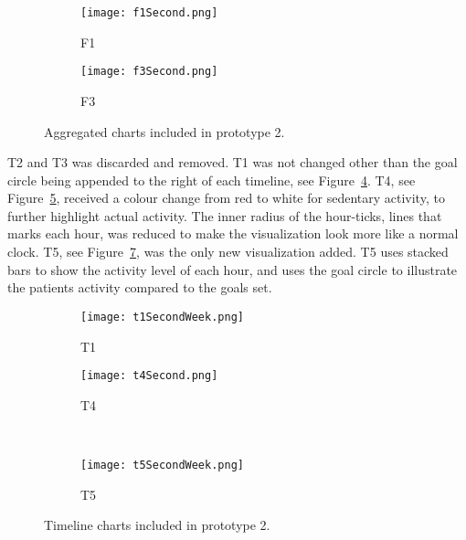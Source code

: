 \begin{figure}[h!]
  \centering
  \begin{subfigure}[b]{0.60\textwidth}
    \centering
    \texttt{[image: f1Second.png]}
    \caption{F1}
    \label{fig:f1Second}
  \end{subfigure}
  \begin{subfigure}[b]{0.39\textwidth}
    \centering
    \texttt{[image: f3Second.png]}
    \caption{F3}
    \label{fig:f3Second}
  \end{subfigure}
  \caption[Second version of F1 and F3]{Aggregated charts included in prototype 2.}
  \label{fig:aggCharts}
\end{figure}

T2 and T3 was discarded and removed. T1 was not changed other than the goal circle being appended to the right of each timeline, see Figure~\ref{fig:t1}. T4, see Figure~\ref{fig:t4}, received a colour change from red to white for sedentary activity, to further highlight actual activity. The inner radius of the hour-ticks, lines that marks each hour, was reduced to make the visualization look more like a normal clock. T5, see Figure~\ref{fig:t5}, was the only new visualization added. T5 uses stacked bars to show the activity level of each hour, and uses the goal circle to illustrate the patients activity compared to the goals set.

\begin{figure}[h!]
  \centering
  \begin{subfigure}[b]{0.6\textwidth}
    \centering
    \texttt{[image: t1SecondWeek.png]}
    \caption{T1}
    \label{fig:t1}
  \end{subfigure}
  \begin{subfigure}[b]{0.35\textwidth}
    \centering
    \texttt{[image: t4Second.png]}
    \caption{T4}
    \label{fig:t4}
  \end{subfigure}
  \\
  \begin{subfigure}[b]{0.95\textwidth}
    \centering
    \texttt{[image: t5SecondWeek.png]}
    \caption{T5}
    \label{fig:t5}
  \end{subfigure}
  \caption[Second version of T1, T4 and first version of T5]{Timeline charts included in prototype 2.}
\end{figure}

